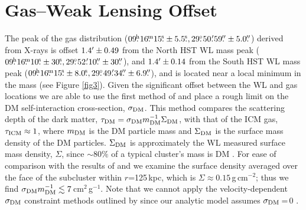 \section{Gas--Weak Lensing Offset}

The peak of the gas distribution ($09\fh16\fm15\fs\pm5.5\fs, 29\fdg50\farcm59\farcs\pm5.0\farcs$) derived from X-rays is offset $1.4\mbox{$^\prime$}\pm0.49$ from the North HST WL mass peak ($09\fh16\fm10\fs\pm30\fs, 29\fdg52\farcm10\farcs\pm30\farcs$), and $1.4\mbox{$^\prime$}\pm0.14$ from the South HST WL mass peak ($09\fh16\fm15\fs\pm8.0\fs, 29\fdg49\farcm34\farcs\pm6.9\farcs$), and is located near a local minimum in the mass (see Figure \ref{fig3}).
Given the significant offset between the WL and gas locations we are able to use the first method of \citet{Markevitch:2004dl} and place a rough limit on the DM self-interaction cross-section, $\sigma_{\rm DM}$.
This method compares the scattering depth of the dark matter, $\tau_{\rm DM}=\sigma_{\rm DM}m^{-1}_{\rm DM} \Sigma_{\rm DM}$, with that of the ICM gas, $\tau_{\rm ICM}\approx 1$, where $m_{\rm DM}$ is the DM particle mass and $\Sigma_{\rm DM}$ is the surface mass density of the DM particles.
$\Sigma_{\rm DM}$ is approximately the WL measured surface mass density, $\Sigma$, since $\sim80\%$ of a typical cluster's mass is DM \citep{Diaferio:2008js}.
For ease of comparison with the results of \citet{Markevitch:2004dl} and \citet{Merten:2011gu} we examine the surface density averaged over the face of the subcluster within $r$=125\,kpc, which is $\Sigma\approx0.15$\,g\,cm$^{-2}$; thus we find $\sigma_{\rm DM} m_{\rm DM}^{-1} \lesssim 7$\,cm$^2$\,g$^{-1}$.  
Note that we cannot apply the velocity-dependent $\sigma_{\rm DM}$ constraint methods outlined by \citet{Markevitch:2004dl} since our analytic model assumes $\sigma_{\rm DM}$\,=\,0 \citep{Dawson:2012dl, Dawson:2012ub}.


